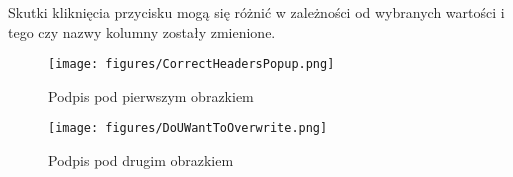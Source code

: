 Skutki kliknięcia przycisku mogą się różnić w zależności od wybranych wartości i tego czy nazwy kolumny zostały zmienione. 

\begin{figure}[htbp]
    \centering
    \begin{minipage}{0.5\textwidth}
        \centering
        \texttt{[image: figures/CorrectHeadersPopup.png]}
        \caption{Podpis pod pierwszym obrazkiem}
        \label{fig:CorrectHeadersPopup}
    \end{minipage}\hfill
    \begin{minipage}{0.5\textwidth}
        \centering
        \texttt{[image: figures/DoUWantToOverwrite.png]}
        \caption{Podpis pod drugim obrazkiem}
        \label{fig:DoYouWantToOverwrite}
    \end{minipage}
    \label{fig:obrazki}
\end{figure}

